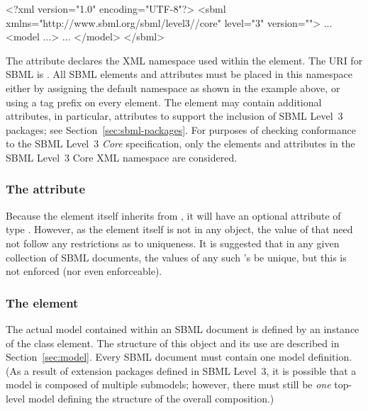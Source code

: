 \begin{example}
<?xml version="1.0" encoding="UTF-8"?>
<sbml xmlns="http://www.sbml.org/sbml/level3//core" level="3" version="">
  ...
  <model ...>
     ...
  </model>
</sbml>
\end{example}

The attribute  declares the XML namespace used within
the  element.  The URI for SBML \thisLV is
.  All SBML
\thisLV elements and attributes must be placed in this namespace
either by assigning the default namespace as shown in the example
above, or using a tag prefix on every element.  The 
element may contain additional attributes, in particular,
attributes to support the inclusion of SBML Level~3 packages; see
Section~\ref{sec:sbml-packages}.  For purposes of checking
conformance to the SBML Level~3 \emph{Core} specification, only
the elements and attributes in the SBML Level~3 Core XML namespace
are considered.

\begin{blockChanged}
\subsubsection{The  attribute}

Because the \SBML element itself inherits from \SBase, it will have an optional  attribute of type .  However, as the \SBML element itself is not in any \Model object, the value of that  need not follow any restrictions as to uniqueness.  It is suggested that in any given collection of SBML documents, the values of any such 's be unique, but this is not enforced (nor even enforceable).
\end{blockChanged}

\subsubsection{The  element}

The actual model contained within an SBML document is defined by
an instance of the \Model class element.  The structure of this
object and its use are described in Section~\ref{sec:model}.
Every SBML document must contain one model definition.  (As a
result of extension packages defined in SBML Level~3, it is
possible that a model is composed of multiple submodels; however,
there must still be \emph{one} top-level model defining the
structure of the overall composition.)


